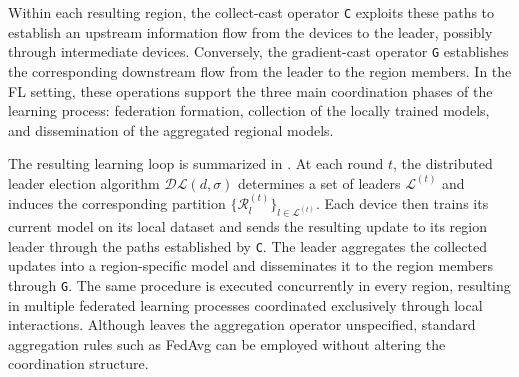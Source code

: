 Within each resulting region, the collect-cast operator \texttt{C} exploits
these paths to establish an upstream information flow from the devices to the
leader, possibly through intermediate devices.
%
Conversely, the gradient-cast operator \texttt{G} establishes the corresponding
downstream flow from the leader to the region members.
%
In the \gls{FL} setting, these operations support the three main coordination
phases of the learning process: federation formation, collection of the locally
trained models, and dissemination of the aggregated regional models.

The resulting learning loop is summarized in
.
%
At each round \(t\), the distributed leader election algorithm
\(\mathcal{DL}(d,\sigma)\) determines a set of leaders
\(\mathcal{L}^{(t)}\) and induces the corresponding partition
\(\{\mathcal{R}_l^{(t)}\}_{l \in \mathcal{L}^{(t)}}\).
%
Each device then trains its current model on its local dataset and sends the
resulting update to its region leader through the paths established by
\texttt{C}.
%
The leader aggregates the collected updates into a region-specific model and
disseminates it to the region members through \texttt{G}.
%
The same procedure is executed concurrently in every region, resulting in
multiple federated learning processes coordinated exclusively through local
interactions.
%
Although  leaves the aggregation operator unspecified,
standard aggregation rules such as \gls{FedAvg} can be employed without
altering the coordination structure.


